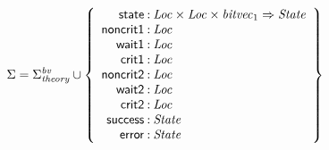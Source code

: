 \documentclass[a4paper]{article}
\def\lthtmlcheckvsize{\ifdim\ht\sizebox<\vsize 
  \ifdim\wd\sizebox<\hsize\expandafter\hfill\fi \expandafter\vfill
  \else\expandafter\vss\fi}%
\begin{document}
{\newpage\clearpage
{}%
$\displaystyle \Sigma = 
\Sigma^{\mathit{bv}}_{\mathit{theory}}\cup\left\{
\begin{array}{r@{\>}c@{\>}l}
\mathsf{state} & : & \mathit{Loc} \times \mathit{Loc} \times \mathit{bitvec}_{1} \Rightarrow \mathit{State}\\
\mathsf{noncrit1} & : & \mathit{Loc}\\
\mathsf{wait1} & : & \mathit{Loc}\\
\mathsf{crit1} & : & \mathit{Loc}\\
\mathsf{noncrit2} & : & \mathit{Loc}\\
\mathsf{wait2} & : & \mathit{Loc}\\
\mathsf{crit2} & : & \mathit{Loc}\\
\mathsf{success} & : & \mathit{State}\\
\mathsf{error} & : & \mathit{State}\\
\end{array}
\right\}
$%
\lthtmlindisplaymathZ
\lthtmlcheckvsize\clearpage}
\end{document}

